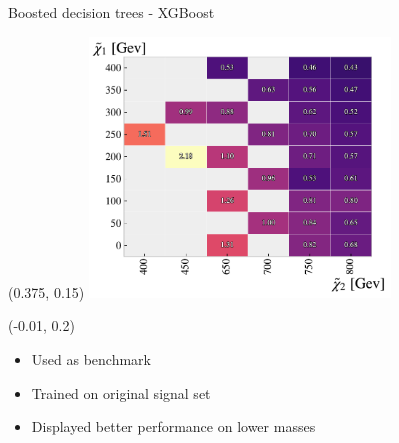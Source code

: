\documentclass[UKenglish]{beamer}
\begin{document}
\begin{frame}{Boosted decision trees - XGBoost}
    \begin{textblock}{1}(0.375, 0.15)
        \includegraphics[width=0.6\textwidth]{figures/grids/XGBGridSig.pdf}    
    \end{textblock}
    \begin{textblock}{0.4}(-0.01, 0.2)
        \begin{itemize}
            \item Used as benchmark
            \item Trained on original signal set
            \item Displayed better performance on lower masses  
        \end{itemize}
    \end{textblock}
\end{frame}

\end{document}
